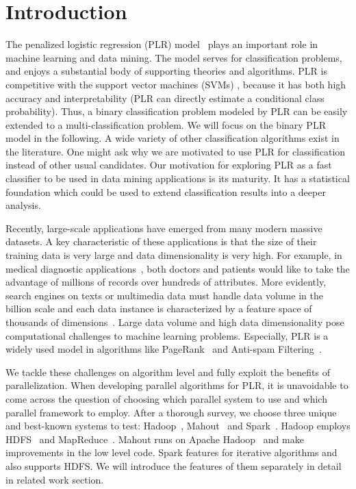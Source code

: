 \documentclass{llncs}
\begin{document}
\section{Introduction} \label{sec:int}
The penalized logistic regression (PLR) model~\cite{HastieBook:SL} plays an important role in machine learning and data mining.
The model serves for classification problems, and enjoys a substantial body of supporting theories and algorithms.
PLR is competitive with the support vector machines (SVMs) \cite{Vapnik:1998}, because it has both high accuracy and interpretability (PLR can directly estimate a conditional class probability).
Thus, a binary classification problem modeled by PLR can be easily extended to a multi-classification problem.
We will focus on the binary PLR model in the following.
A wide variety of other classification algorithms exist in the literature.
One might ask why we are motivated to use PLR for classification instead of other usual candidates.
Our motivation for exploring PLR as a fast classifier to be used in data mining applications is its maturity.
It has a statistical foundation which could be used to extend classification results into a deeper analysis.

Recently, large-scale applications have emerged from many modern massive datasets.
A key characteristic of these applications is that the size of their training data is very large and data dimensionality is very high.
For example, in medical diagnostic applications~\cite{tsumoto2004mining}, both doctors and patients would like to take the advantage of millions of records over hundreds of attributes. More evidently, search engines on texts or multimedia data must handle data volume in the billion scale and each data instance is characterized by a feature space of thousands of dimensions~\cite{genkin2007large}.
Large data volume and high data dimensionality pose computational challenges to machine learning problems.
Especially, PLR is a widely used model in algorithms like PageRank~\cite{page1999pagerank} and Anti-spam Filtering~\cite{androutsopoulos2000evaluation}.

We tackle these challenges on algorithm level and fully exploit the benefits of parallelization.
When developing parallel algorithms for PLR, it is unavoidable to come across the question of choosing which parallel system to use and which parallel framework to employ.
After a thorough survey, we choose three unique and best-known systems to test: Hadoop~\cite{white2012hadoop}, Mahout~\cite{mahoutscalable} and Spark~\cite{zaharia2010spark}.
Hadoop employs HDFS~\cite{borthakur2008hdfs} and MapReduce~\cite{dean2008mapreduce}. Mahout runs on Apache Hadoop~\cite{gropp1999using} and make improvements in the low level code. Spark features for iterative algorithms and also supports HDFS.
We will introduce the features of them separately in detail in related work section.
\end{document}
